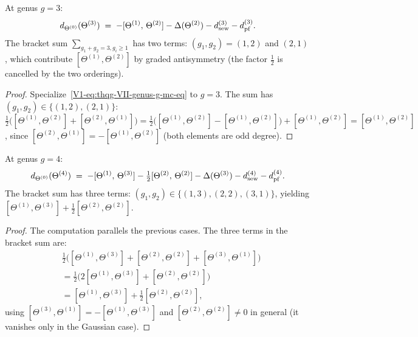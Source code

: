 \begin{proposition}
\label{prop:thqg-VII-genus3}
At genus $g = 3$:
\begin{equation}%
d_{\Theta^{(0)}}(\Theta^{(3)})
\;=\;
-[\Theta^{(1)},\, \Theta^{(2)}]
- \Delta(\Theta^{(2)})
- \dsew^{(3)}
- \dpf^{(3)}.
\end{equation}
The bracket sum $\sum_{g_1+g_2=3, g_i \geq 1}$ has two terms:
$(g_1,g_2) = (1,2)$ and $(2,1)$, which contribute
$[\Theta^{(1)},\Theta^{(2)}]$ by graded antisymmetry
(the factor $\tfrac{1}{2}$ is cancelled by the two orderings).
\end{proposition}

\begin{proof}
Specialize~\eqref{V1-eq:thqg-VII-genus-g-mc-eq} to $g = 3$. The
sum has $(g_1,g_2) \in \{(1,2),(2,1)\}$:
$\tfrac{1}{2}\bigl([\Theta^{(1)},\Theta^{(2)}]
+ [\Theta^{(2)},\Theta^{(1)}]\bigr)
= \tfrac{1}{2}\bigl([\Theta^{(1)},\Theta^{(2)}]
- [\Theta^{(1)},\Theta^{(2)}]\bigr)
+ [\Theta^{(1)},\Theta^{(2)}]
= [\Theta^{(1)},\Theta^{(2)}]$,
since $[\Theta^{(2)},\Theta^{(1)}] = -[\Theta^{(1)},
\Theta^{(2)}]$ (both elements are odd degree).
\end{proof}

\begin{proposition}
\label{prop:thqg-VII-genus4}
At genus $g = 4$:
\begin{equation}%
d_{\Theta^{(0)}}(\Theta^{(4)})
\;=\;
-[\Theta^{(1)},\, \Theta^{(3)}]
- \tfrac{1}{2}[\Theta^{(2)},\, \Theta^{(2)}]
- \Delta(\Theta^{(3)})
- \dsew^{(4)}
- \dpf^{(4)}.
\end{equation}
The bracket sum has three terms:
$(g_1,g_2) \in \{(1,3),(2,2),(3,1)\}$, yielding
$[\Theta^{(1)},\Theta^{(3)}]
+ \tfrac{1}{2}[\Theta^{(2)},\Theta^{(2)}]$.
\end{proposition}

\begin{proof}
The computation parallels the previous cases. The three terms
in the bracket sum are:
\begin{align*}
&\tfrac{1}{2}\bigl(
[\Theta^{(1)},\Theta^{(3)}]
+ [\Theta^{(2)},\Theta^{(2)}]
+ [\Theta^{(3)},\Theta^{(1)}]
\bigr)\\
&= \tfrac{1}{2}\bigl(
2[\Theta^{(1)},\Theta^{(3)}]
+ [\Theta^{(2)},\Theta^{(2)}]
\bigr)\\
&= [\Theta^{(1)},\Theta^{(3)}]
+ \tfrac{1}{2}[\Theta^{(2)},\Theta^{(2)}],
\end{align*}
using $[\Theta^{(3)},\Theta^{(1)}]
= -[\Theta^{(1)},\Theta^{(3)}]$ and
$[\Theta^{(2)},\Theta^{(2)}] \neq 0$ in general
(it vanishes only in the Gaussian case).
\end{proof}

